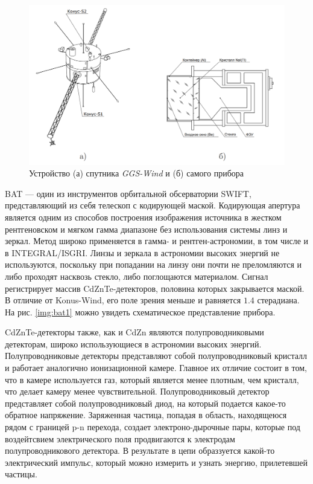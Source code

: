 	\begin{figure}[h!]
		\centering
		\includegraphics[width = 0.75\linewidth]{pictures/Konus-Wind.png}
		\caption{Устройство (а) спутника \textit{GGS-Wind} и (б) самого прибора}
		\label{img:kw1}
	\end{figure}
	
	BAT --- один из инструментов орбитальной обсерватории SWIFT, представляющий из себя телескоп с кодирующей маской. Кодирующая апертура является одним из способов построения изображения источника в жестком рентгеновском и мягком гамма диапазоне без использования системы линз и зеркал. Метод широко применяется в гамма- и рентген-астрономии, в том числе и в INTEGRAL/ISGRI. Линзы и зеркала в астрономии высоких энергий не используются, поскольку при попадании на линзу они почти не преломляются и либо проходят насквозь стекло, либо поглощаются материалом. Сигнал регистрирует массив CdZnTe-детекторов, половина которых закрывается маской. В отличие от Konus-Wind, его поле зрения меньше и равняется $1.4$ стерадиана. На рис. \ref{img:bat1} можно увидеть схематическое представление прибора.
	 
	 CdZnTe-детекторы также, как и CdZn являются полупроводниковыми детекторам, широко использующиеся в астрономии высоких энергий. Полупроводниковые детекторы представляют собой полупроводниковый кристалл и работает аналогично ионизационной камере. Главное их отличие состоит в том, что в камере используется газ, который является менее плотным, чем кристалл, что делает камеру менее чувствительной. Полупроводниковый детектор представляет собой полупроводниковый диод, на который подается какое-то обратное напряжение. Заряженная частица, попадая в область, находящеюся рядом с границей p-n перехода, создает электроно-дырочные пары, которые под воздейтсвием электрического поля продвигаются к электродам полупроводникового детектора. В результате в цепи образзуется какой-то электрический импульс, который можно измерить и узнать энергию, прилетевшей частицы. 
	
